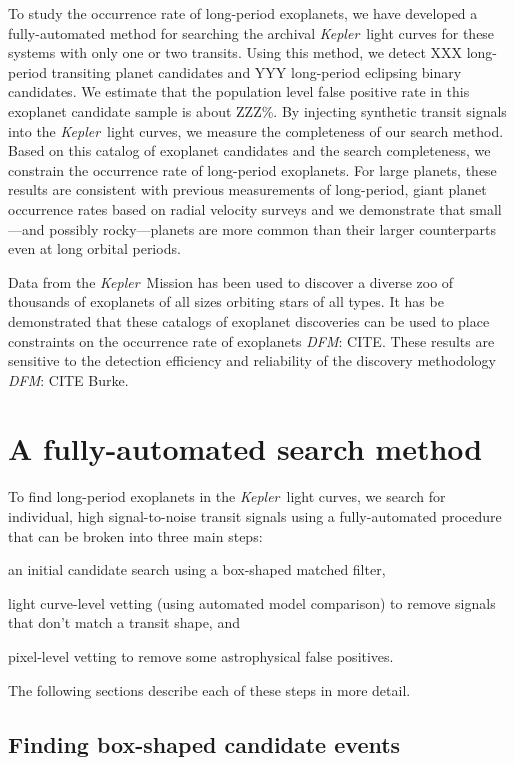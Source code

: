 \documentclass[onecolumn]{aastex6}
\newcommand{\project}[1]{\textsl{#1}}
\newcommand{\kepler}{\project{Kepler}}
\newcommand{\todo}[3]{{\color{#2}\emph{#1}: #3}}
\newcommand{\dfmtodo}[1]{\todo{DFM}{red}{#1}}
\begin{document}
To study the occurrence rate of long-period exoplanets, we have developed a
fully-automated method for searching the archival \kepler\ light curves for
these systems with only one or two transits.
Using this method, we detect XXX long-period transiting planet candidates and
YYY long-period eclipsing binary candidates.
We estimate that the population level false positive rate in this exoplanet
candidate sample is about ZZZ\%.
By injecting synthetic transit signals into the \kepler\ light curves, we
measure the completeness of our search method.
Based on this catalog of exoplanet candidates and the search completeness, we
constrain the occurrence rate of long-period exoplanets.
For large planets, these results are consistent with previous measurements of
long-period, giant planet occurrence rates based on radial velocity surveys
and we demonstrate that small---and possibly rocky---planets are more common
than their larger counterparts even at long orbital periods.

Data from the \kepler\ Mission has been used to discover a diverse zoo of
thousands of exoplanets of all sizes orbiting stars of all types.
It has be demonstrated that these catalogs of exoplanet discoveries can be
used to place constraints on the occurrence rate of exoplanets \dfmtodo{CITE}.
These results are sensitive to the detection efficiency and reliability of the
discovery methodology \dfmtodo{CITE Burke}.

\section{A fully-automated search method}

To find long-period exoplanets in the \kepler\ light curves, we search for
individual, high signal-to-noise transit signals using a fully-automated
procedure that can be broken into three main steps:
\begin{enumerate}
{\item an initial candidate search using a box-shaped matched filter,}
{\item light curve-level vetting (using automated model comparison) to remove
signals that don't match a transit shape, and}
{\item pixel-level vetting to remove some astrophysical false positives.}
\end{enumerate}
The following sections describe each of these steps in more detail.

\subsection{Finding box-shaped candidate events}
\end{document}
